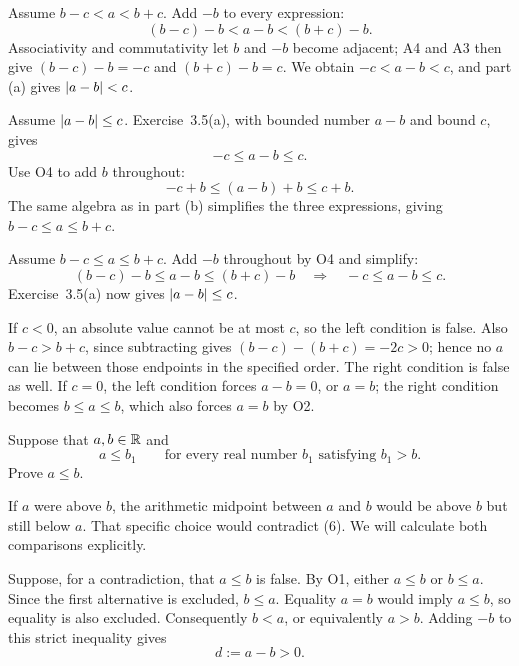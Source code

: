 Assume $b-c<a<b+c$. Add $-b$ to every expression:
\[
 (b-c)-b<a-b<(b+c)-b.
\]
Associativity and commutativity let $b$ and $-b$ become adjacent;
A4 and A3 then give $(b-c)-b=-c$ and $(b+c)-b=c$.
We obtain $-c<a-b<c$, and part (a) gives $\left|a-b\right|<c$.


Assume $\left|a-b\right|\le c$. Exercise~3.5(a), with bounded number $a-b$
and bound $c$, gives
\[
 -c\le a-b\le c.
\]
Use O4 to add $b$ throughout:
\[
 -c+b\le(a-b)+b\le c+b.
\]
The same algebra as in part (b) simplifies the three expressions,
giving $b-c\le a\le b+c$.

Assume $b-c\le a\le b+c$. Add $-b$ throughout by O4 and simplify:
\[
 (b-c)-b\le a-b\le(b+c)-b
 \quad\Longrightarrow\quad
 -c\le a-b\le c.
\]
Exercise~3.5(a) now gives $\left|a-b\right|\le c$.

If $c<0$, an absolute value cannot be at most $c$, so the left condition
is false. Also $b-c>b+c$, since subtracting gives
$(b-c)-(b+c)=-2c>0$; hence no $a$ can lie between those endpoints in
the specified order. The right condition is false as well.
If $c=0$, the left condition forces $a-b=0$, or $a=b$; the right
condition becomes $b\le a\le b$, which also forces $a=b$ by O2.



\goal Suppose that $a,b\in\mathbb{R}$ and
\[
 a\le b_1\qquad\text{for every real number $b_1$ satisfying $b_1>b$}.
 \tag{6}
\]
Prove $a\le b$.

\idea If $a$ were above $b$, the arithmetic midpoint between $a$ and $b$
would be above $b$ but still below $a$. That specific choice would
contradict (6). We will calculate both comparisons explicitly.

Suppose, for a contradiction, that $a\le b$ is false. By O1, either
$a\le b$ or $b\le a$. Since the first alternative is excluded,
$b\le a$. Equality $a=b$ would imply $a\le b$, so equality is also
excluded. Consequently $b<a$, or equivalently $a>b$.
Adding $-b$ to this strict inequality gives
\[
 d:=a-b>0.
\]

